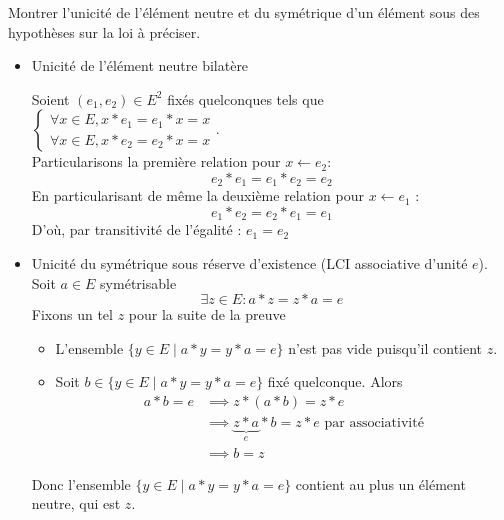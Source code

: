 \documentclass{article}
\begin{document}
\begin{question_kholle}{Montrer l'unicité de l'élément neutre et du symétrique d'un élément sous des hypothèses sur la loi à préciser.}
  \;\\
  \begin{itemize}[label=$\lozenge$]
    \item Unicité de l'élément neutre bilatère

          Soient $(e_{1}, e_{2}) \in E^{2}$ fixés quelconques tels que $\left\{ \begin{array}{ll} \forall x \in E, x * e_{1} = e_{1} * x = x \\ \forall x \in E, x*e_{2}=e_{2}*x = x\end{array}\right.$.\\
          Particularisons la première relation pour $x \leftarrow e_{2}$:
          $$
            e_{2}*e_{1} = e_{1}*e_{2} = e_{2}
          $$
          En particularisant de même la deuxième relation pour $x \leftarrow e_{1}$ :
          $$
            e_{1}*e_{2} = e_{2}*e_{1} = e_{1}
          $$
          D'où, par transitivité de l'égalité : $e_{1} = e_{2}$

    \item Unicité du symétrique sous réserve d'existence (LCI associative d'unité $e$).\\
          Soit $a \in E$ symétrisable
          $$
            \exists z \in E : a * z = z*a = e
          $$
          Fixons un tel $z$ pour la suite de la preuve
          \begin{itemize}
            \item L'ensemble $\{ y \in E \mid a * y = y * a = e \}$ n'est pas vide puisqu'il contient $z$.

            \item Soit $b \in \{ y \in E \mid a * y = y * a = e \}$ fixé quelconque.
                  Alors
                  \begin{align*}
                    a * b = e & \implies z * ( a * b ) = z * e                                          \\
                              & \implies \underbrace{ z*a }_{ e } * b = z * e \text{ par associativité} \\
                              & \implies b = z
                  \end{align*}
          \end{itemize}
          Donc l'ensemble $\{ y \in E \mid a * y = y * a = e \}$ contient au plus un élément neutre, qui est $z$.
  \end{itemize}
\end{question_kholle}
\end{document}
